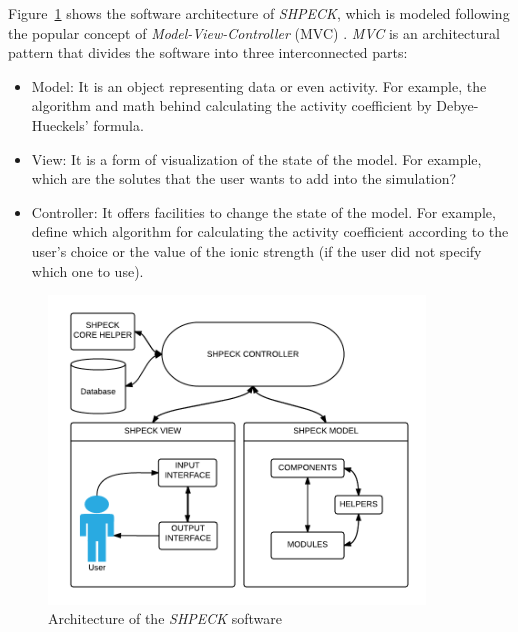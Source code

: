 Figure~\ref{fig:shpeck-architecture} shows the software architecture of \emph{SHPECK}, which is modeled following the popular concept of \emph{Model-View-Controller} (MVC) \cite{Gamma:94}. \emph{MVC} is an architectural pattern that divides the software into three interconnected parts:
\begin{itemize}
\item Model: It is an object representing data or even activity. For example, the algorithm and math behind calculating the activity coefficient by Debye-Hueckels' formula.
\item View: It is a form of visualization of the state of the model. For example, which are the solutes that the user wants to add into the simulation?
\item Controller: It offers facilities to change the state of the model. For example, define which algorithm for calculating the activity coefficient according to the user's choice or the value of the ionic strength (if the user did not specify which one to use).
\end{itemize}

\begin{figure}[ht!]
\centering
\includegraphics[width=100mm]{figures/shpeck-architecture.png}
\caption{Architecture of the \emph{SHPECK} software}
\label{fig:shpeck-architecture}
\end{figure}

